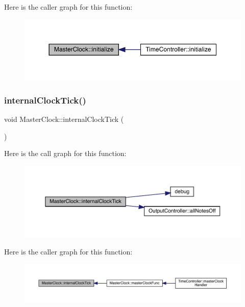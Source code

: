 Here is the caller graph for this function\+:
\nopagebreak
\begin{figure}[H]
\begin{center}
\leavevmode
\includegraphics[width=350pt]{class_master_clock_aa7106b58216e1bc65dc88cdbba1d0514_icgraph}
\end{center}
\end{figure}
\mbox{\label{class_master_clock_a96924e6693fee4ac2f9994583d0f33ba}} 
\subsubsection{\texorpdfstring{internal\+Clock\+Tick()}{internalClockTick()}}
{\footnotesize\ttfamily void Master\+Clock\+::internal\+Clock\+Tick (\begin{DoxyParamCaption}{ }\end{DoxyParamCaption})}

Here is the call graph for this function\+:
\nopagebreak
\begin{figure}[H]
\begin{center}
\leavevmode
\includegraphics[width=350pt]{class_master_clock_a96924e6693fee4ac2f9994583d0f33ba_cgraph}
\end{center}
\end{figure}
Here is the caller graph for this function\+:
\nopagebreak
\begin{figure}[H]
\begin{center}
\leavevmode
\includegraphics[width=350pt]{class_master_clock_a96924e6693fee4ac2f9994583d0f33ba_icgraph}
\end{center}
\end{figure}
\mbox{\label{class_master_clock_a6d2a014da8caf9c4f39917ce4c09b83d}} 
